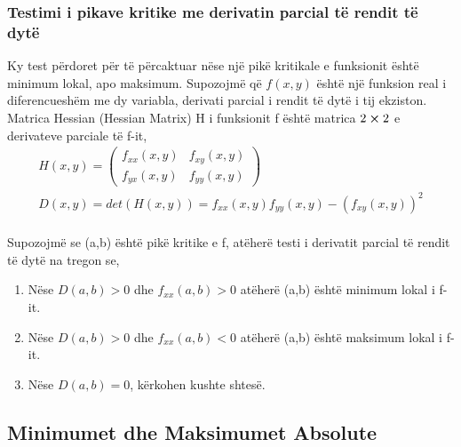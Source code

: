 \documentclass[a4paper]{article}
\begin{document}
\subsubsection{Testimi i pikave kritike me derivatin parcial të rendit të dytë}
Ky test përdoret për të përcaktuar nëse një pikë kritikale e funksionit është minimum lokal, apo maksimum. Supozojmë që $f(x,y)$ është një funksion real i diferencueshëm me dy variabla, derivati parcial i rendit të dytë i tij ekziston. Matrica Hessian (Hessian Matrix) H i funksionit f është matrica $2\cross 2$ e derivateve parciale të f-it,
\begin{gather}
	H(x,y) = \begin{pmatrix} f_{x x}(x,y) & f_{x y}(x,y) \\
		f_{y x}(x,y) & f_{y y}(x,y)
	\end{pmatrix}\\
	D(x,y) = det\left( H(x,y) \right) = f_{x x}(x,y)f_{y y}(x,y) - (f_{x y}(x,y))^2
\end{gather}\\
Supozojmë se (a,b) është pikë kritike e f, atëherë testi i derivatit parcial të rendit të dytë na tregon se,
\begin{enumerate}
	\item Nëse $D(a,b) > 0$ dhe $f_{x x}(a,b) > 0$ atëherë (a,b) është minimum lokal i f-it.
	\item Nëse $D(a,b) > 0$ dhe $f_{x x}(a,b) < 0$ atëherë (a,b) është maksimum lokal i f-it.
	\item Nëse $D(a,b) = 0$, kërkohen kushte shtesë.
\end{enumerate}

\subsection{Minimumet dhe Maksimumet Absolute}
\end{document}
